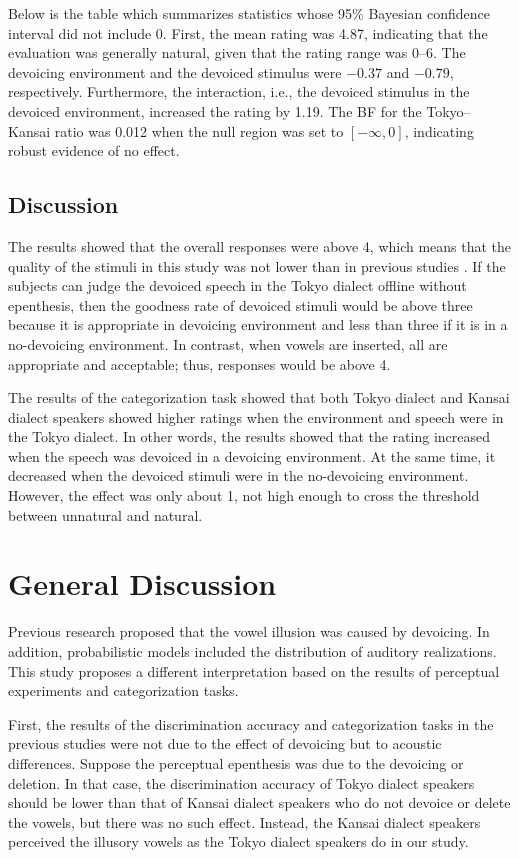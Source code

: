 \documentclass[a4paper,11pt,twocolumn]{article}
\begin{document}
Below is the table which summarizes statistics whose 95\% Bayesian confidence interval did not include 0. First, the mean rating was 4.87, indicating that the evaluation was generally natural, given that the rating range was 0--6. The devoicing environment and the devoiced stimulus were $-0.37$ and $-0.79$, respectively. Furthermore, the interaction, i.e., the devoiced stimulus in the devoiced environment, increased the rating by 1.19. The BF for the Tokyo--Kansai ratio was 0.012 when the null region was set to $[-\infty, 0]$, indicating robust evidence of no effect.

\subsection{Discussion}

The results showed that the overall responses were above 4, which means that the quality of the stimuli in this study was not lower than in previous studies \cite{kilpatrick2018japanese}. If the subjects can judge the devoiced speech in the Tokyo dialect offline without epenthesis, then the goodness rate of devoiced stimuli would be above three because it is appropriate in devoicing environment and less than three if it is in a no-devoicing environment. In contrast, when vowels are inserted, all are appropriate and acceptable; thus, responses would be above 4.

The results of the categorization task showed that both Tokyo dialect and Kansai dialect speakers showed higher ratings when the environment and speech were in the Tokyo dialect. In other words, the results showed that the rating increased when the speech was devoiced in a devoicing environment. At the same time, it decreased when the devoiced stimuli were in the no-devoicing environment. However, the effect was only about 1, not high enough to cross the threshold between unnatural and natural.

\section{General Discussion}

Previous research proposed that the vowel illusion was caused by devoicing. In addition, probabilistic models included the distribution of auditory realizations. This study proposes a different interpretation based on the results of perceptual experiments and categorization tasks.

First, the results of the discrimination accuracy and categorization tasks in the previous studies were not due to the effect of devoicing but to acoustic differences. Suppose the perceptual epenthesis was due to the devoicing or deletion. In that case, the discrimination accuracy of Tokyo dialect speakers should be lower than that of Kansai dialect speakers who do not devoice or delete the vowels, but there was no such effect. Instead, the Kansai dialect speakers perceived the illusory vowels as the Tokyo dialect speakers do in our study.
\end{document}
